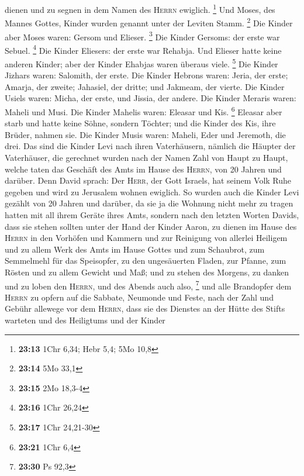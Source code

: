 dienen und zu segnen in dem Namen des \textsc{Herrn} ewiglich.
\footnote{\textbf{23:13} 1Chr 6,34; Hebr 5,4; 5Mo 10,8} 
Und Moses, des Mannes Gottes, Kinder wurden genannt unter der Leviten
Stamm. \footnote{\textbf{23:14} 5Mo 33,1}  Die Kinder
aber Moses waren: Gersom und Elieser. \footnote{\textbf{23:15} 2Mo
  18,3-4}  Die Kinder Gersoms: der erste war Sebuel.
\footnote{\textbf{23:16} 1Chr 26,24}  Die Kinder
Eliesers: der erste war Rehabja. Und Elieser hatte keine anderen Kinder;
aber der Kinder Ehabjas waren überaus viele. \footnote{\textbf{23:17}
  1Chr 24,21-30}  Die Kinder Jizhars waren: Salomith, der
erste.  Die Kinder Hebrons waren: Jeria, der erste;
Amarja, der zweite; Jahasiel, der dritte; und Jakmeam, der vierte.
 Die Kinder Usiels waren: Micha, der erste, und Jissia,
der andere.  Die Kinder Meraris waren: Maheli und Musi.
Die Kinder Mahelis waren: Eleasar und Kis. \footnote{\textbf{23:21} 1Chr
  6,4}  Eleasar aber starb und hatte keine Söhne, sondern
Töchter; und die Kinder des Kis, ihre Brüder, nahmen sie.
 Die Kinder Musis waren: Maheli, Eder und Jeremoth, die
drei.  Das sind die Kinder Levi nach ihren Vaterhäusern,
nämlich die Häupter der Vaterhäuser, die gerechnet wurden nach der Namen
Zahl von Haupt zu Haupt, welche taten das Geschäft des Amts im Hause des
\textsc{Herrn}, von 20 Jahren und darüber.  Denn David
sprach: Der \textsc{Herr}, der Gott Israels, hat seinem Volk Ruhe
gegeben und wird zu Jerusalem wohnen ewiglich.  So wurden
auch die Kinder Levi gezählt von 20 Jahren und darüber, da sie ja die
Wohnung nicht mehr zu tragen hatten mit all ihrem Geräte ihres Amts,
 sondern nach den letzten Worten Davids, 
dass sie stehen sollten unter der Hand der Kinder Aaron, zu dienen im
Hause des \textsc{Herrn} in den Vorhöfen und Kammern und zur Reinigung
von allerlei Heiligem und zu allem Werk des Amts im Hause Gottes
 und zum Schaubrot, zum Semmelmehl für das Speisopfer, zu
den ungesäuerten Fladen, zur Pfanne, zum Rösten und zu allem Gewicht und
Maß;  und zu stehen des Morgens, zu danken und zu loben
den \textsc{Herrn}, und des Abends auch also, \footnote{\textbf{23:30}
  Ps 92,3}  und alle Brandopfer dem \textsc{Herrn} zu
opfern auf die Sabbate, Neumonde und Feste, nach der Zahl und Gebühr
allewege vor dem \textsc{Herrn},  dass sie des Dienstes
an der Hütte des Stifts warteten und des Heiligtums und der Kinder
